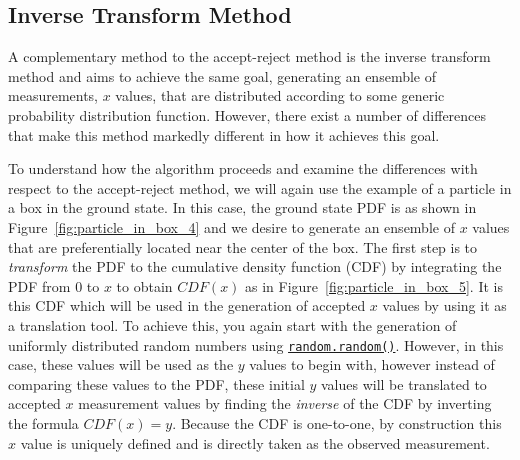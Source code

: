 \documentclass[UKenglish,texlive=2016]{\ATLASLATEXPATH atlasdoc}
\begin{document}
\subsection{Inverse Transform Method}
A complementary method to the accept-reject method is the inverse transform method and aims to achieve the same goal, generating an ensemble of measurements, $x$ values, that are distributed according to some generic probability distribution function.  However, there exist a number of differences that make this method markedly different in how it achieves this goal.  

To understand how the algorithm proceeds and examine the differences with respect to the accept-reject method, we will again use the example of a particle in a box in the ground state.  In this case, the ground state PDF is as shown in Figure~\ref{fig:particle_in_box_4} and we desire to generate an ensemble of $x$ values that are preferentially located near the center of the box.  The first step is to \textit{transform} the PDF to the cumulative density function (CDF) by integrating the PDF from 0 to $x$ to obtain $CDF(x)$ as in Figure~\ref{fig:particle_in_box_5}.  It is this CDF which will be used in the generation of accepted $x$ values by using it as a translation tool.  To achieve this, you again start with the generation of uniformly distributed random numbers using \href{https://docs.python.org/2/library/random.html}{\texttt{random.random()}}.  However, in this case, these values will be used as the $y$ values to begin with, however instead of comparing these values to the PDF, these initial $y$ values will be translated to accepted $x$ measurement values by finding the \textit{inverse} of the CDF by inverting the formula $CDF(x)=y$.  Because the CDF is one-to-one, by construction this $x$ value is uniquely defined and is directly taken as the observed measurement.  
\end{document}
